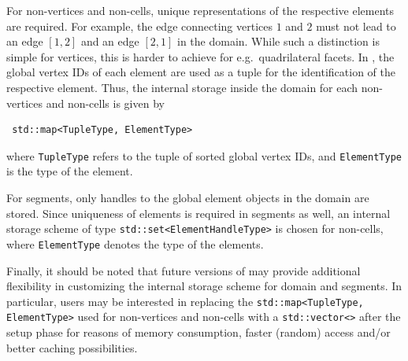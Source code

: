For non-vertices and non-cells, unique representations of the respective elements are required. For example, the edge connecting vertices $1$ and $2$ must not lead to an edge $[1,2]$ and an edge $[2,1]$ in the domain.
While such a distinction is simple for vertices, this is harder to achieve for e.g.~quadrilateral facets.
In {\ViennaGrid}, the global vertex IDs of each element are used as a tuple for the identification of the respective element.
Thus, the internal storage inside the domain for each non-vertices and non-cells is given by
\begin{lstlisting}
 std::map<TupleType, ElementType>
\end{lstlisting}
where \lstinline|TupleType| refers to the tuple of sorted global vertex IDs, and \lstinline|ElementType| is the type of the element.

For segments, only handles to the global element objects in the domain are stored.
Since uniqueness of elements is required in segments as well, an internal storage scheme of type \lstinline|std::set<ElementHandleType>| is chosen
for non-cells, where \lstinline|ElementType| denotes the type of the elements.

Finally, it should be noted that future versions of {\ViennaGrid} may provide additional flexibility in customizing the internal storage scheme for domain and segments.
In particular, users may be interested in replacing the \lstinline|std::map<TupleType, ElementType>| used for non-vertices and non-cells with a \lstinline|std::vector<>| after the setup phase for reasons of memory consumption, faster (random) access and/or better caching possibilities.



